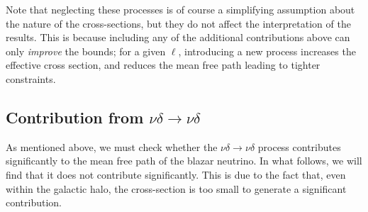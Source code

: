\documentclass[10pt]{article}
\begin{document}
Note that neglecting these processes is of course a simplifying assumption about the nature of the cross-sections, but they do not affect the interpretation of the results. This is because including any of the additional contributions above can only \textit{improve} the bounds; for a given $\ell$, introducing a new process increases the effective cross section, and reduces the mean free path leading to tighter constraints.
\subsection{Contribution from $\nu\delta \rightarrow \nu\delta$}
As mentioned above, we must check whether the $\nu\delta \rightarrow \nu\delta$ process contributes significantly to the mean free path of the blazar neutrino. In what follows, we will find that it does not contribute significantly. This is due to the fact that, even within the galactic halo, the cross-section is too small to generate a significant contribution.
\end{document}
